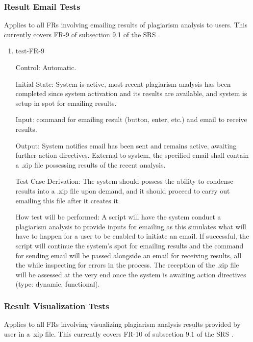 \documentclass[12pt, titlepage]{article}
\begin{document}
\subsubsection{Result Email Tests}

Applies to all FRs involving emailing results of plagiarism analysis to users. 
This currently covers FR-9 of subsection 9.1 of the SRS \citep{SRS}.

\begin{enumerate}

\item{test-FR-9\\}

Control: Automatic.
					
Initial State: System is active, most recent plagiarism analysis has been 
completed since system activation and its results are available, and system
is setup in spot for emailing results.
					
Input: command for emailing result (button, enter, etc.) and email to 
receive results.
					
Output: System notifies email has been sent and remains active, awaiting 
further action directives. External to system, the specified email shall
contain a .zip file possessing results of the recent analysis.

Test Case Derivation: The system should possess the ability to condense results
into a .zip file upon demand, and it should proceed to carry out emailing this 
file after it creates it.

How test will be performed: A script will have the system conduct a 
plagiarism analysis to provide inputs for emailing as this
simulates what will have to happen for a user to be enabled to initiate an email.
If successful, the script will continue the system's spot for emailing results
and the command for sending email will be passed alongside an email for receiving 
results, all the while inspecting for errors in the process. The reception of the 
.zip file will be assessed at the very end once the system is awaiting action 
directives (type: dynamic, functional).
					

\end{enumerate}

\subsubsection{Result Visualization Tests}

Applies to all FRs involving visualizing plagiarism analysis results provided 
by user in a .zip file. This currently covers FR-10 of subsection 9.1 of the SRS 
\citep{SRS}.
\end{document}
